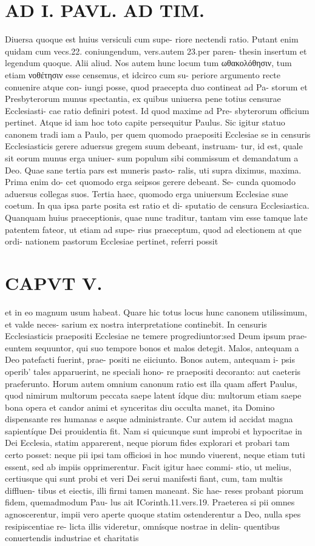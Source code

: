 \documentclass{article}
\begin{document}
\begin{pages}
\section*{AD I. PAVL. AD TIM. }
\marginpar{[ p.904 ]}   Diuersa quoque est huius versiculi cum supe- riore nectendi ratio. Putant enim quidam cum vecs.22. coniungendum, vers.autem 23.per paren- thesin insertum et legendum quoque. Alii aliud. Nos autem hunc locum tum ωθακολόθησιν, tum etiam νοθέτησιν esse censemus, et idcirco cum su- periore argumento recte conuenire atque con- iungi posse, quod praecepta duo contineat ad Pa- storum et Presbyterorum munus spectantia, ex quibus uniuersa pene totius censurae Ecclesiasti- cae ratio definiri potest. Id quod maxime ad Pre- sbyterorum officium pertinet. Atque id iam hoc toto capite persequitur Paulus. Sic igitur statuo canonem tradi iam a Paulo, per quem quomodo praepositi Ecclesiae se in censuris Ecclesiasticis gerere aduersus gregem suum debeant, instruam- tur, id est, quale sit eorum munus erga uniuer- sum populum sibi commissum et demandatum a Deo. Quae sane tertia pars est muneris pasto- ralis, uti supra diximus, maxima. Prima enim do- cet quomodo erga seipsos gerere debeant. Se- cunda quomodo aduersus collegas suos. Tertia haec, quomodo erga uniuersum Ecclesiae suae coetum. In qua ipsa parte posita est ratio et di- sputatio de censura Ecclesiastica. Quanquam huius praeceptionis, quae nunc traditur, tantam vim esse tamque late patentem fateor, ut etiam ad supe- rius praeceptum, quod ad electionem at que ordi- nationem pastorum Ecclesiae pertinet, referri possit 
\section*{CAPVT V. }
\marginpar{[ p.385 ]}et in eo magnum usum habeat. Quare hic totus locus hunc canonem utilissimum, et valde neces- sarium ex nostra interpretatione continebit. In censuris Ecclesiasticis praepositi Ecclesiae ne temere progrediuntor:sed Deum ipsum prae- euntem sequuntor, qui suo tempore bonos et malos detegit. Malos, antequam a Deo patefacti fuerint, prae- positi ne eiiciunto. Bonos autem, antequam i- psis operib' tales apparuerint, ne speciali hono- re praepositi decoranto: aut caeteris praeferunto. Horum autem omnium canonum ratio est illa quam affert Paulus, quod nimirum multorum peccata saepe latent ídque diu: multorum etiam saepe bona opera et candor animi et synceritas diu occulta manet, ita Domino dispensante res humanas e asque administrante.  Cur autem id accidat magna sapientíque Dei prouidentia fit. Nam si quicunque sunt improbi et hypocritae in Dei Ecclesia, statim apparerent, neque piorum fides explorari et probari tam certo posset: neque pii ipsi tam officiosi in hoc mundo viuerent, neque etiam tuti essent, sed ab impiis opprimerentur. Facit igitur haec commi- stio, ut melius, certiusque qui sunt probi et veri Dei serui manifesti fiant, cum, tam multis diffluen- tibus et eiectis, illi firmi tamen maneant. Sic hae- reses probant piorum fidem, quemadmodum Pau- lus ait ICorinth.11.vers.19. Praeterea si pii omnes agnoscerentur, impii vero aperte quoque statim ostenderentur a Deo, nulla spes resipiscentiae re- licta illis videretur, omnísque nostrae in delin- quentibus conuertendis industriae et charitatis 

\end{pages}
\end{document}
